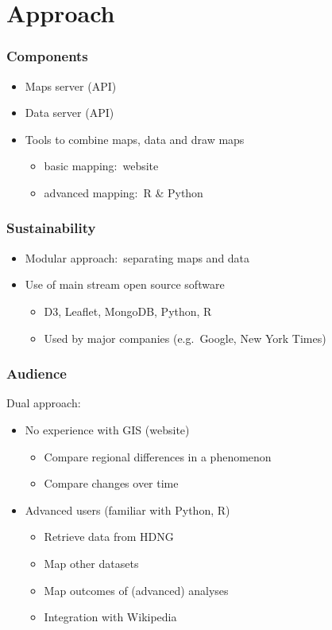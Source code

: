 \documentclass{beamer}
\begin{document}
\section{Approach}
\begin{frame}
	\frametitle{Components}
	\begin{itemize}
		\item Maps server (API)
		\item Data server (API) 
		\item Tools to combine maps, data and draw maps
			\begin{itemize}
				\item basic mapping:~website
				\item advanced mapping:~R \& Python
			\end{itemize}
	\end{itemize}
\end{frame}
\begin{frame}
	\frametitle{Sustainability}
	\begin{itemize}
		\item Modular approach:~separating maps and data
		\item Use of main stream open source software
			\begin{itemize}
				\item D3, Leaflet, MongoDB, Python, R
				\item Used by major companies (e.g.~Google, New York Times)
			\end{itemize}
	\end{itemize}
\end{frame}
\begin{frame}
	\frametitle{Audience}
		Dual approach:
		\begin{itemize}
			\item No experience with GIS (website)
				\begin{itemize}
					\item Compare regional differences in a phenomenon
					\item Compare changes over time
				\end{itemize}
			\item Advanced users (familiar with Python, R)
				\begin{itemize}
					\item Retrieve data from HDNG
					\item Map other datasets
					\item Map outcomes of (advanced) analyses
					\item Integration with Wikipedia
				\end{itemize}
		\end{itemize}
\end{frame}
\end{document}
